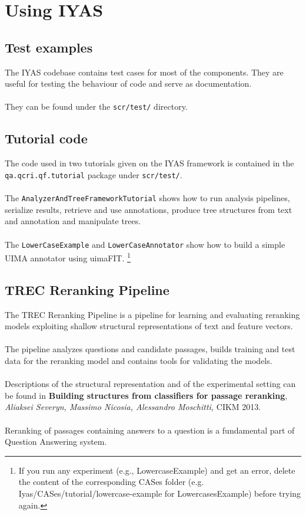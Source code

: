 \documentclass{wileysev}
\begin{document}
\chapter[Using IYAS]{Using IYAS}

\section{Test examples}

The IYAS codebase contains test cases for most of the components. They are useful for testing the behaviour of code and serve as documentation.
\\\\
They can be found under the \texttt{scr/test/} directory.

\section{Tutorial code}

The code used in two tutorials given on the IYAS framework is contained in the\\ \texttt{qa.qcri.qf.tutorial} package under \texttt{scr/test/}.
\\\\
The \texttt{AnalyzerAndTreeFrameworkTutorial} shows how to run analysis pipelines, serialize results, retrieve and use annotations, produce tree structures from text and annotation and manipulate trees.
\\\\
The \texttt{LowerCaseExample} and \texttt{LowerCaseAnnotator} show how to build 
a simple UIMA annotator using uimaFIT.%
\footnote{If you run any experiment (e.g., LowercaseExample) and get an error, 
delete the content of the corresponding CASes folder (e.g. 
Iyas/CASes/tutorial/lowercase-example for LowercasesExample) before trying 
again.}

\section{TREC Reranking Pipeline}

The TREC Reranking Pipeline is a pipeline for learning and evaluating reranking models exploiting shallow structural representations of text and feature vectors.
\\\\
The pipeline analyzes questions and candidate passages, builds training and test data for the reranking model and contains tools for validating the models.
\\\\
Descriptions of the structural representation and of the experimental setting can be found in \textbf{Building structures from classifiers for passage reranking}, \textit{Aliaksei Severyn,
Massimo Nicosia, Alessandro Moschitti,} CIKM 2013.
\\\\
Reranking of passages containing answers to a question is a fundamental part of Question Answering system. 
\end{document}
